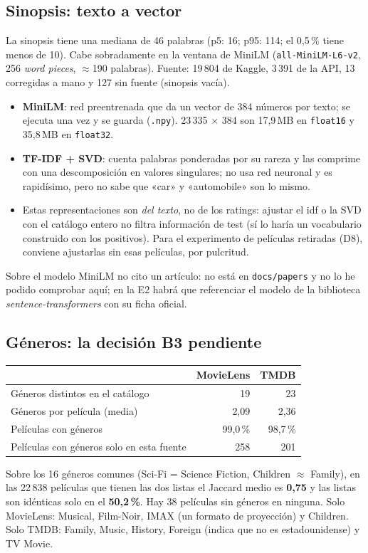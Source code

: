 \documentclass[a4paper,11pt]{article}
\begin{document}
\subsection{Sinopsis: texto a vector}
La sinopsis tiene una mediana de 46 palabras (p5: 16; p95: 114; el 0,5\,\% tiene menos de 10). Cabe sobradamente en la ventana de MiniLM
(\texttt{all-MiniLM-L6-v2}, 256 \emph{word pieces}, $\approx$190 palabras). Fuente: 19\,804 de Kaggle, 3\,391 de la API, 13 corregidas a mano y 127
sin fuente (sinopsis vacía).
\begin{itemize}
  \item \textbf{MiniLM}: red preentrenada que da un vector de 384 números por texto; se ejecuta una vez y se guarda
        (\texttt{.npy}). 23\,335 $\times$ 384 son 17,9\,MB en \texttt{float16} y 35,8\,MB en \texttt{float32}.
  \item \textbf{TF-IDF + SVD}: cuenta palabras ponderadas por su rareza y las comprime con una descomposición en
        valores singulares; no usa red neuronal y es rapidísimo, pero no sabe que «car» y «automobile» son lo mismo.
  \item Estas representaciones son \emph{del texto}, no de los ratings: ajustar el idf o la SVD con el catálogo entero no filtra
        información de test (sí lo haría un vocabulario construido con los positivos). Para el experimento de películas retiradas
        (D8), conviene ajustarlas sin esas películas, por pulcritud.
\end{itemize}
Sobre el modelo MiniLM no cito un artículo: no está en \texttt{docs/papers} y no lo he podido comprobar aquí; en la E2 habrá que
referenciar el modelo de la biblioteca \emph{sentence-transformers} con su ficha oficial.

\subsection{Géneros: la decisión B3 pendiente}
\begin{center}
\small
\begin{tabular}{lrr}
\toprule
 & MovieLens & TMDB \\
\midrule
Géneros distintos en el catálogo & 19 & 23 \\
Géneros por película (media) & 2,09 & 2,36 \\
Películas con géneros & 99,0\,\% & 98,7\,\% \\
Películas con géneros solo en esta fuente & 258 & 201 \\
\bottomrule
\end{tabular}
\end{center}
Sobre los 16 géneros comunes (Sci-Fi = Science Fiction, Children $\approx$ Family), en las 22\,838 películas que tienen las dos
listas el Jaccard medio es \textbf{0,75} y las listas son idénticas solo en el \textbf{50,2\,\%}. Hay 38 películas sin géneros
en ninguna. Solo MovieLens: Musical, Film-Noir, IMAX (un formato de proyección) y Children. Solo TMDB: Family, Music, History,
Foreign (indica que no es estadounidense) y TV Movie.
\end{document}
